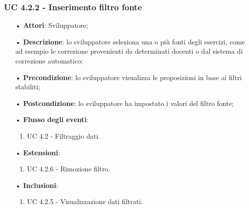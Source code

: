 \subsubsection{UC 4.2.2 - Inserimento filtro fonte}
\begin{itemize}
\item[•]\textbf{Attori}: Sviluppatore;
\item[•]\textbf{Descrizione}: lo sviluppatore seleziona una o più fonti degli esercizi, come ad esempio le correzione provenienti da determinati docenti o dal sistema di correzione automatico;
\item[•]\textbf{Precondizione}: lo sviluppatore visualizza le proposizioni in base ai filtri stabiliti;
\item[•]\textbf{Postcondizione}: lo sviluppatore ha impostato i valori del filtro fonte;
\item[•]\textbf{Flusso degli eventi}: 
	\begin{enumerate}
	\item UC 4.2 - Filtraggio dati.
\end{enumerate}
\item[•]\textbf{Estensioni}: 
\begin{enumerate}
	\item UC 4.2.6 - Rimozione filtro.
\end{enumerate}
\item[•]\textbf{Inclusioni}:
\begin{enumerate}
\item UC 4.2.5 - Visualizzazione dati filtrati.
\end{enumerate}
\end{itemize}

